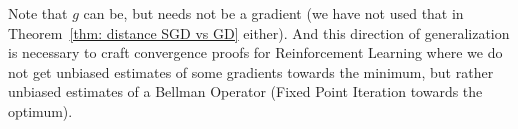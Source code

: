 Note that \(g\) can be, but needs not be a gradient (we have not used that in
Theorem~\ref{thm: distance SGD vs GD} either). And this direction of
generalization is necessary to craft convergence proofs for Reinforcement
Learning where we do not get unbiased estimates of some gradients towards the
minimum, but rather unbiased estimates of a Bellman Operator (Fixed Point 
Iteration towards the optimum).



